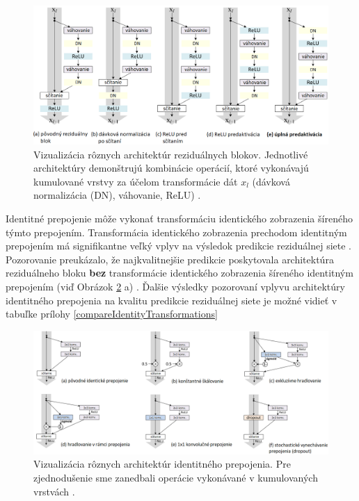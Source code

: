 \begin{figure}
\centerline{\includegraphics[width=1\textwidth]{images/architectures_of_residual_blocks}}
\caption[Vizualizácia rôznych architektúr reziduálnych blokov]{Vizualizácia rôznych architektúr reziduálnych blokov. Jednotlivé architektúry demonštrujú kombinácie operácií, ktoré vykonávajú kumulované vrstvy za účelom transformácie dát $x_l$ (dávková normalizácia (DN), váhovanie, ReLU) \cite{He2016}.}
\label{fig:architectures_of_residual_blocks}
\end{figure}

Identitné prepojenie môže vykonať transformáciu identického zobrazenia šíreného týmto prepojením. Transformácia identického zobrazenia prechodom identitným prepojením má signifikantne veľký vplyv na výsledok predikcie reziduálnej siete \cite{He2016}. Pozorovanie preukázalo, že najkvalitnejšie predikcie poskytovala architektúra reziduálneho bloku \textbf{bez} transformácie identického zobrazenia šíreného identitným prepojením (viď Obrázok \ref{fig:achitectures_of_identity_shortcut} a) \cite{He2016}. Ďalšie výsledky pozorovaní vplyvu architektúry identitného prepojenia na kvalitu predikcie reziduálnej siete je možné vidieť v tabuľke prílohy \ref{compareIdentityTransformations}

\begin{figure}
\centerline{\includegraphics[width=1\textwidth]{images/achitectures_of_identity_shortcut}}
\caption[Vizualizácia rôznych architektúr identitneho prepojenia]{Vizualizácia rôznych architektúr identitného prepojenia. Pre zjednodušenie sme zanedbali operácie vykonávané v kumulovaných vrstvách \cite{He2016}.}
\label{fig:achitectures_of_identity_shortcut}
\end{figure}



